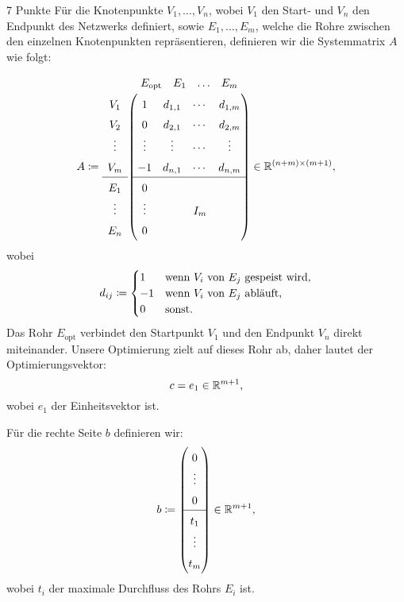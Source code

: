 \documentclass{problemset}
\begin{document}
\begin{problem}{7 Punkte}
Für die Knotenpunkte \( V_1, \ldots, V_n \), wobei \( V_1 \) den Start- und \(
V_n \) den Endpunkt des Netzwerks definiert, sowie \( E_1, \ldots, E_m \),
welche die Rohre zwischen den einzelnen Knotenpunkten repräsentieren,
definieren wir die Systemmatrix \( A \) wie folgt:
\[
    A \coloneq
    \renewcommand{\arraystretch}{1.5}
    \begin{array}{c}
        V_1 \\ V_2 \\ \vdots \\ V_m \\ \hline E_1 \\ \vdots \\ E_n
    \end{array}
    \overset{
        \begin{array}{llll}
            E_{\text{opt}} & E_1 & \ldots & E_m
        \end{array}
    }
    {
        \begin{pmatrix}
            1      & d_{1, 1} & \cdots & d_{1, m} \\
            0      & d_{2, 1} & \cdots & d_{2, m} \\
            \vdots & \vdots   & \cdots & \vdots   \\
            -1     & d_{n, 1} & \cdots & d_{n, m} \\
            \hline
            0      &          &        &          \\
            \vdots &          & I_m    &          \\
            0      &          &        &          \\
        \end{pmatrix}
    }
    \in \reals^{(n+m) \times (m+1)},
\]
wobei
\[
    d_{ij} \coloneq \begin{cases}
        1  & \text{wenn \( V_i \) von \( E_j \) gespeist wird}, \\
        -1 & \text{wenn \( V_i \) von \( E_j \) abläuft},       \\
        0  & \text{sonst}.
    \end{cases}
\]
Das Rohr \( E_{\text{opt}} \) verbindet den Startpunkt \( V_1 \) und den
  Endpunkt \( V_n \) direkt miteinander. Unsere Optimierung zielt auf dieses
  Rohr ab, daher lautet der Optimierungsvektor:
\[
    c = e_1 \in \mathbb{R}^{m+1},
\]
wobei \( e_1 \) der Einheitsvektor ist.

Für die rechte Seite \( b \) definieren wir:
\[
    b \coloneq \begin{pmatrix}
        0 \\ \vdots \\ 0 \\ \hline t_1 \\ \vdots \\ t_m
    \end{pmatrix} \in \reals^{m+1},
\]
wobei \( t_i \) der maximale Durchfluss des Rohrs \( E_i \) ist.


\end{problem}
\end{document}
